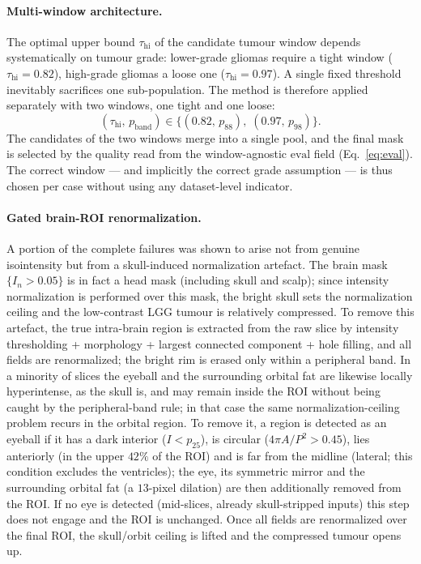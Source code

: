 \documentclass[11pt,a4paper]{article}
\begin{document}
\paragraph{Multi-window architecture.} The optimal upper bound
$\tau_{\text{hi}}$ of the candidate tumour window depends systematically on tumour
grade: lower-grade gliomas require a tight window ($\tau_{\text{hi}}=0.82$),
high-grade gliomas a loose one ($\tau_{\text{hi}}=0.97$). A single fixed threshold
inevitably sacrifices one sub-population. The method is therefore applied
separately with two windows, one tight and one loose:
\begin{equation}
(\tau_{\text{hi}},\,p_{\text{band}})\in\{(0.82,\,p_{88}),\;(0.97,\,p_{98})\}.
\label{eq:windows}
\end{equation}
The candidates of the two windows merge into a single pool, and the final mask is
selected by the quality read from the window-agnostic $\mathrm{eval}$ field
(Eq.~\ref{eq:eval}). The correct window --- and implicitly the correct grade
assumption --- is thus chosen per case without using any dataset-level indicator.

\paragraph{Gated brain-ROI renormalization.} A portion of the complete failures
was shown to arise not from genuine isointensity but from a skull-induced
normalization artefact. The brain mask $\{I_n>0.05\}$ is in fact a head mask
(including skull and scalp); since intensity normalization is performed over this
mask, the bright skull sets the normalization ceiling and the low-contrast LGG
tumour is relatively compressed. To remove this artefact, the true intra-brain
region is extracted from the raw slice by intensity thresholding + morphology +
largest connected component + hole filling, and all fields are renormalized; the
bright rim is erased only within a peripheral band. In a minority of slices the
eyeball and the surrounding orbital fat are likewise locally hyperintense, as the
skull is, and may remain inside the ROI without being caught by the
peripheral-band rule; in that case the same normalization-ceiling problem recurs
in the orbital region. To remove it, a region is detected as an eyeball if it has
a dark interior ($I<p_{25}$), is circular ($4\pi A/P^2>0.45$), lies anteriorly (in
the upper $42\%$ of the ROI) and is far from the midline (lateral; this condition
excludes the ventricles); the eye, its symmetric mirror and the surrounding
orbital fat (a $13$-pixel dilation) are then additionally removed from the ROI. If
no eye is detected (mid-slices, already skull-stripped inputs) this step does not
engage and the ROI is unchanged. Once all fields are renormalized over the final
ROI, the skull/orbit ceiling is lifted and the compressed tumour opens up.
\end{document}
